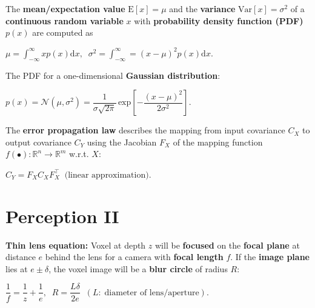 \documentclass[landscape]{article}
\newcommand{\vmspace}{\vspace{-7pt}}
\newcommand{\vpspace}{\vspace{5pt}}
\newcommand{\vtspace}{\vspace{-10pt}}
\begin{document}
\begin{multicols}{3}
\vpspace

\begin{minipage}{\columnwidth}
  The \textbf{mean/expectation value} $\mathrm{E}[x] = \mu$ and the
  \textbf{variance} $\mathrm{Var}[x] = \sigma^2$ of a \textbf{continuous random
  variable} $x$ with \textbf{probability density function (PDF)} $p(x)$ are
  computed as
  \vmspace
  \begin{center}
    $\mu = \int_{-\infty}^{\infty}xp(x)\mathrm dx,\;\;
    \sigma^2 = \int_{-\infty}^{\infty} = (x - \mu)^2 p(x)
    \mathrm dx.$
  \end{center}
\end{minipage}

\vpspace

\begin{minipage}{\columnwidth}
  The PDF for a one-dimensional \textbf{Gaussian distribution}:
  \vmspace
  \begin{center}
    $p(x)
    =
    \mathcal N (\mu, \sigma^2)
    =
    \dfrac{1}{\sigma \sqrt{2\pi}}\,\mathrm{exp}\left[-\dfrac{(x -
    \mu)^2}{2\sigma^2}\right].$
  \end{center}
\end{minipage}

\vpspace

\begin{minipage}{\columnwidth}
  The \textbf{error propagation law} describes the mapping from input covariance
  $C_X$ to output covariance $C_Y$ using the Jacobian $F_X$ of the mapping
  function $f(\bullet): \mathbb{R}^n \rightarrow \mathbb{R}^m$ w.r.t. $X$:
  \vmspace
  \begin{center}
    $C_Y=F_XC_XF_X^\intercal\;\;\text{(linear approximation)}.$
  \end{center}
\end{minipage}


\vtspace

\section{Perception II}

\vmspace

\begin{minipage}{\columnwidth}
  \textbf{Thin lens equation:} Voxel at depth $z$ will be \textbf{focused} on
  the \textbf{focal plane} at distance $e$ behind the lens for a camera with
  \textbf{focal length} $f$. If the \textbf{image plane} lies at $e \pm \delta$,
  the voxel image will be a \textbf{blur circle} of radius $R$:
  \vmspace
  \begin{center}
    $\dfrac{1}{f} = \dfrac{1}{z} + \dfrac{1}{e},\;\; R = \dfrac{L \delta}{2e}
    \;\;
    (L:\;\text{diameter of lens/aperture}).$
  \end{center}
\end{minipage}


\end{multicols}
\end{document}
